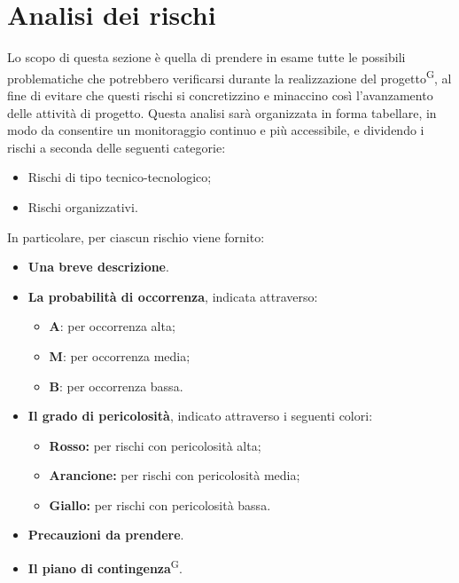 \section{Analisi dei rischi}\label{sec:analisi_rischi}
Lo scopo di questa sezione è quella di prendere in esame tutte le possibili problematiche che potrebbero verificarsi durante la realizzazione del progetto\textsuperscript{G}, al fine di evitare che questi rischi si concretizzino e minaccino così l'avanzamento delle attività di progetto.
Questa analisi sarà organizzata in forma tabellare, in modo da consentire un monitoraggio continuo e più accessibile, e dividendo i rischi a seconda delle seguenti categorie:
\begin{itemize}
    \item Rischi di tipo tecnico-tecnologico;
    \item Rischi organizzativi.
\end{itemize}
In particolare, per ciascun rischio viene fornito:
\begin{itemize}
    \item \textbf{Una breve descrizione}.
    \item \textbf{La probabilità di occorrenza}, indicata attraverso:
        \begin{itemize}
            \item \textbf{A}: per occorrenza alta;
            \item \textbf{M}: per occorrenza media;
            \item \textbf{B}: per occorrenza bassa.
        \end{itemize}
    \item \textbf{Il grado di pericolosità}, indicato attraverso i seguenti colori:
        \begin{itemize}
        \item \colorbox{red!50}{\textbf{Rosso:}} per rischi con pericolosità alta;
        \item \colorbox{orange!50}{\textbf{Arancione:}} per rischi con pericolosità media;
        \item \colorbox{yellow!75}{\textbf{Giallo:}} per rischi con pericolosità bassa.
        \end{itemize}
    \item \textbf{Precauzioni da prendere}.
    \item \textbf{Il piano di contingenza}\textsuperscript{G}.
\end{itemize}

